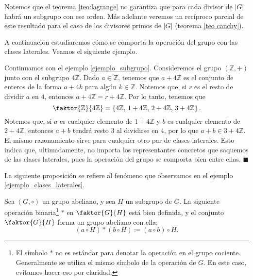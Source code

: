 Notemos que el teorema \ref{teo:lagrange} no garantiza que para cada divisor de $|G|$ habrá un subgrupo con ese orden. Más adelante veremos un recíproco parcial de este resultado para el caso de los divisores primos de $|G|$ (teorema \ref{teo cauchy}).


A continuación estudiaremos cómo se comporta la operación del grupo con las clases laterales. Veamos el siguiente ejemplo.

\begin{example} \label{ejemplo_clases_laterales}
Continuamos con el ejemplo \ref{ejemplo_subgrupo}. Consideremos el grupo $(\mathbb{Z}, +)$ junto con el subgrupo $4\mathbb{Z}$. Dado $a \in \mathbb{Z}$, tenemos que $a + 4\mathbb{Z}$ es el conjunto de enteros de la forma $a + 4k$ para algún $k \in \mathbb{Z}$. Notemos que, si $r$ es el resto de dividir $a$ en $4$, entonces $a + 4\mathbb{Z} = r + 4\mathbb{Z}$. Por lo tanto, tenemos que
$$\faktor{\mathbb{Z}}{4\mathbb{Z}} = \left\{ 4\mathbb{Z},\, 1+4\mathbb{Z},\, 2+4\mathbb{Z},\, 3+4\mathbb{Z}\right\}.$$
Notemos que, si $a$ es cualquier elemento de $1+4\mathbb{Z}$ y $b$ es cualquier elemento de $2+4\mathbb{Z}$, entonces $a+b$ tendrá resto $3$ al dividirse en $4$, por lo que $a+b \in 3+4\mathbb{Z}$. El mismo razonamiento sirve para cualquier otro par de clases laterales. Esto indica que, ultimadamente, no importa los representantes concretos que saquemos de las clases laterales, pues la operación del grupo se comporta bien entre ellas.  
\hfill$\blacksquare$
\end{example}

La siguiente proposición se refiere al fenómeno que observamos en el ejemplo \ref{ejemplo_clases_laterales}.

\begin{prop} \label{grupo_cociente}
Sea $(G, \circ)$ un grupo abeliano, y sea $H$ un subgrupo de $G$. La siguiente operación binaria\footnote{El símbolo $\ast$ no es estándar para denotar la operación en el grupo cociente. Generalmente se utiliza el mismo símbolo de la operación de $G$. En este caso, evitamos hacer eso por claridad.} $\ast$ en $\faktor{G}{H}$ está bien definida, y el conjunto $\faktor{G}{H}$ forma un grupo abeliano con ella:
$$\left(a \circ H \right) \ast \left( b \circ H \right) \coloneqq  (a \circ b) \circ H .$$
\end{prop}

